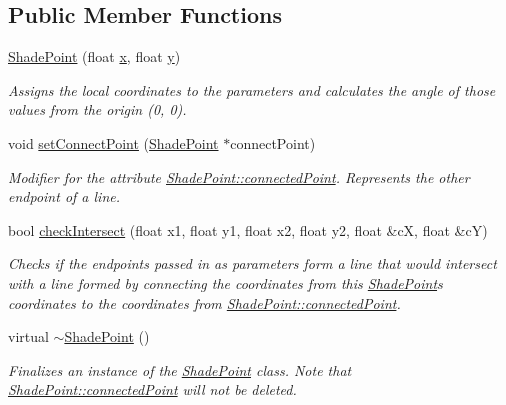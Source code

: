 \subsection*{Public Member Functions}
\begin{DoxyCompactItemize}
\item 
\hyperlink{classlighting_1_1ShadePoint_aaebbffa8b934868a07455343a1943e25}{Shade\+Point} (float \hyperlink{classlighting_1_1ShadePoint_a087db3eacccf6731f674f123c22400ec}{x}, float \hyperlink{classlighting_1_1ShadePoint_a427350496a448f0dd7424955a6c21ea2}{y})
\begin{DoxyCompactList}\small\item\em Assigns the local coordinates to the parameters and calculates the angle of those values from the origin (0, 0). \end{DoxyCompactList}\item 
void \hyperlink{classlighting_1_1ShadePoint_a6d8d66a55dd8b16974bf138bbfcac183}{set\+Connect\+Point} (\hyperlink{classlighting_1_1ShadePoint}{Shade\+Point} $\ast$connect\+Point)
\begin{DoxyCompactList}\small\item\em Modifier for the attribute \hyperlink{classlighting_1_1ShadePoint_a0840495febcd385a90e89e003aa15972}{Shade\+Point\+::connected\+Point}. Represents the other endpoint of a line. \end{DoxyCompactList}\item 
bool \hyperlink{classlighting_1_1ShadePoint_af520192e696fc33d0aec19f0f4519a28}{check\+Intersect} (float x1, float y1, float x2, float y2, float \&cX, float \&cY)
\begin{DoxyCompactList}\small\item\em Checks if the endpoints passed in as parameters form a line that would intersect with a line formed by connecting the coordinates from {\ttfamily  this } \hyperlink{classlighting_1_1ShadePoint}{Shade\+Point}s coordinates to the coordinates from \hyperlink{classlighting_1_1ShadePoint_a0840495febcd385a90e89e003aa15972}{Shade\+Point\+::connected\+Point}. \end{DoxyCompactList}\item 
virtual \hyperlink{classlighting_1_1ShadePoint_a87875dcdefcbf587d2a060831b2ec628}{$\sim$\+Shade\+Point} ()
\begin{DoxyCompactList}\small\item\em Finalizes an instance of the \hyperlink{classlighting_1_1ShadePoint}{Shade\+Point} class. Note that \hyperlink{classlighting_1_1ShadePoint_a0840495febcd385a90e89e003aa15972}{Shade\+Point\+::connected\+Point} will not be deleted. \end{DoxyCompactList}\end{DoxyCompactItemize}
